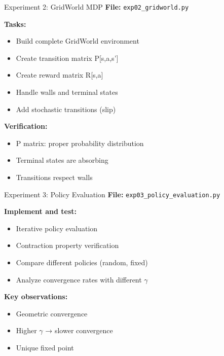 \documentclass[aspectratio=169,10pt]{beamer}
\begin{document}
\begin{frame}{Experiment 2: GridWorld MDP}
\textbf{File:} \texttt{exp02\_gridworld.py}

\textbf{Tasks:}
\begin{itemize}
    \item Build complete GridWorld environment
    \item Create transition matrix P[s,a,s']
    \item Create reward matrix R[s,a]
    \item Handle walls and terminal states
    \item Add stochastic transitions (slip)
\end{itemize}

\textbf{Verification:}
\begin{itemize}
    \item P matrix: proper probability distribution
    \item Terminal states are absorbing
    \item Transitions respect walls
\end{itemize}
\end{frame}

\begin{frame}{Experiment 3: Policy Evaluation}
\textbf{File:} \texttt{exp03\_policy\_evaluation.py}

\textbf{Implement and test:}
\begin{itemize}
    \item Iterative policy evaluation
    \item Contraction property verification
    \item Compare different policies (random, fixed)
    \item Analyze convergence rates with different $\gamma$
\end{itemize}

\textbf{Key observations:}
\begin{itemize}
    \item Geometric convergence
    \item Higher $\gamma$ → slower convergence
    \item Unique fixed point
\end{itemize}
\end{frame}
\end{document}
